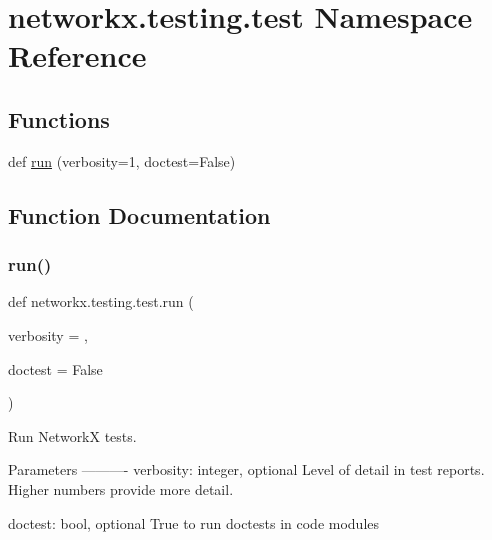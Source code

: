 \hypertarget{namespacenetworkx_1_1testing_1_1test}{}\section{networkx.\+testing.\+test Namespace Reference}
\label{namespacenetworkx_1_1testing_1_1test}
\subsection*{Functions}
\begin{DoxyCompactItemize}
\item 
def \hyperlink{namespacenetworkx_1_1testing_1_1test_a937ff5fab0c53edbe70a99f52697d84d}{run} (verbosity=1, doctest=False)
\end{DoxyCompactItemize}


\subsection{Function Documentation}
\mbox{\label{namespacenetworkx_1_1testing_1_1test_a937ff5fab0c53edbe70a99f52697d84d}} 
\subsubsection{\texorpdfstring{run()}{run()}}
{\footnotesize\ttfamily def networkx.\+testing.\+test.\+run (\begin{DoxyParamCaption}\item[{}]{verbosity = {},  }\item[{}]{doctest = {\ttfamily False} }\end{DoxyParamCaption})}

\begin{DoxyVerb}Run NetworkX tests.

Parameters
----------
verbosity: integer, optional
  Level of detail in test reports.  Higher numbers provide more detail.

doctest: bool, optional
  True to run doctests in code modules
\end{DoxyVerb}
 